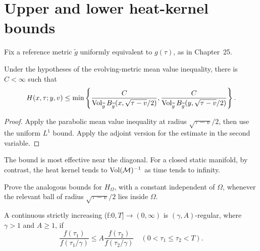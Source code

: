 \section{Upper and lower heat-kernel bounds}

Fix a reference metric \(\widetilde g\) uniformly equivalent to \(g(\tau)\),
as in Chapter~25.

\begin{lemma}
\label{lem:chow-iii-rough-evolving-heat-kernel-upper-bound}
Under the hypotheses of the evolving-metric mean value inequality, there is
\(C<\infty\) such that
\[
 H(x,\tau;y,v)\le\min\left\{
 \frac{C}{\operatorname{Vol}_{\widetilde g}B_{\widetilde g}(x,\sqrt{\tau-v}/2)},
 \frac{C}{\operatorname{Vol}_{\widetilde g}B_{\widetilde g}(y,\sqrt{\tau-v}/2)}
 \right\}.
\]
\end{lemma}
\begin{proof}
Apply the parabolic mean value inequality at radius \(\sqrt{\tau-v}/2\),
then use the uniform \(L^1\) bound.  Apply the adjoint version for the estimate
in the second variable.
\end{proof}

\begin{remark}
\label{rem:chow-iii-rough-upper-bound-interpretation}
The bound is most effective near the diagonal.  For a closed static manifold,
by contrast, the heat kernel tends to \(\Vol(\mathcal M)^{-1}\) as time tends
to infinity.
\end{remark}

\begin{claim}
\label{clm:chow-iii-rough-dirichlet-upper-bound-exercise}
Prove the analogous bounds for \(H_\Omega\), with a constant independent of
\(\Omega\), whenever the relevant ball of radius \(\sqrt{\tau-v}/2\) lies
inside \(\Omega\).
\end{claim}

\begin{definition}
\label{def:chow-iii-gamma-a-regular-function}
A continuous strictly increasing (f:\(0,T]\to(0,\infty)\) is
\((\gamma,A)\)-regular, where \(\gamma>1\) and \(A\ge1\), if
\[
 \frac{f(\tau_1)}{f(\tau_1/\gamma)}\le
 A\frac{f(\tau_2)}{f(\tau_2/\gamma)}
 \quad(0<\tau_1\le\tau_2<T).
\]
\end{definition}

